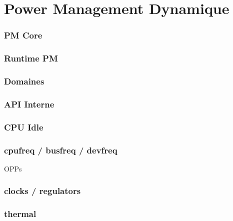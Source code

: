 \section{Power Management Dynamique}

\begin{frame}
	\frametitle{PM Core}
\end{frame}

\begin{frame}
	\frametitle{Runtime PM}
\end{frame}

\begin{frame}
	\frametitle{Domaines}
\end{frame}


\begin{frame}
	\frametitle{API Interne}
\end{frame}

\begin{frame}
	\frametitle{CPU Idle}
\end{frame}

\begin{frame}
	\frametitle{cpufreq / busfreq / devfreq}
	OPPs
\end{frame}

\begin{frame}
	\frametitle{clocks / regulators}
\end{frame}

\begin{frame}
	\frametitle{thermal}
\end{frame}



